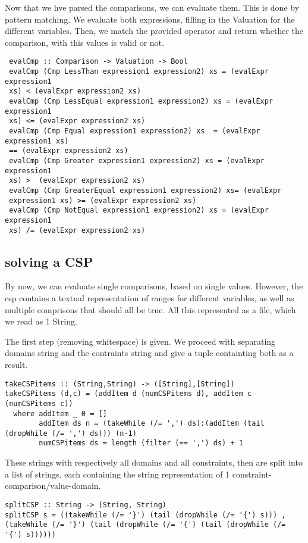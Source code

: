 \documentclass[a4paper,11pt]{article}
\begin{document}
 Now that we hve parsed the comparisons, we can evaluate them. This is done 
 by pattern matching. We evaluate both expressions, filling in the Valuation 
 for the different variables. Then, we match the provided operator and 
 return whether the comparison, with this values is valid or not.
 \begin{lstlisting}
 evalCmp :: Comparison -> Valuation -> Bool
 evalCmp (Cmp LessThan expression1 expression2) xs = (evalExpr expression1 
 xs) < (evalExpr expression2 xs)
 evalCmp (Cmp LessEqual expression1 expression2) xs = (evalExpr expression1 
 xs) <= (evalExpr expression2 xs)
 evalCmp (Cmp Equal expression1 expression2) xs  = (evalExpr expression1 xs) 
 == (evalExpr expression2 xs)
 evalCmp (Cmp Greater expression1 expression2) xs = (evalExpr expression1 
 xs) >  (evalExpr expression2 xs)
 evalCmp (Cmp GreaterEqual expression1 expression2) xs= (evalExpr 
 expression1 xs) >= (evalExpr expression2 xs)
 evalCmp (Cmp NotEqual expression1 expression2) xs = (evalExpr expression1 
 xs) /= (evalExpr expression2 xs)
 \end{lstlisting}
 \subsection{solving a CSP}
 
 By now, we can evaluate single comparisons, based on single values. 
 However, the csp contains a textual representation of ranges for different 
 variables, as well as multiple comprisons that should all be true. All this 
 represented as a file, which we read as 1 String.
 
 The first step (removing whitespace) is given. We proceed with separating 
 domains string and the contraints string and give a tuple containting both 
 as a result.
 
\begin{lstlisting}
takeCSPitems :: (String,String) -> ([String],[String])
takeCSPitems (d,c) = (addItem d (numCSPitems d), addItem c (numCSPitems c))
  where addItem _ 0 = []
        addItem ds n = (takeWhile (/= ',') ds):(addItem (tail (dropWhile (/= ',') ds))) (n-1)
        numCSPitems ds = length (filter (== ',') ds) + 1
\end{lstlisting}
 
 These strings with respectively all domains and all constraints, then are split into a list of strings, each containing the string representation of 1 constraint-comparison/value-domain.
 
\begin{lstlisting}
splitCSP :: String -> (String, String)
splitCSP s = ((takeWhile (/= '}') (tail (dropWhile (/= '{') s))) , (takeWhile (/= '}') (tail (dropWhile (/= '{') (tail (dropWhile (/= '{') s))))))
\end{lstlisting}
 
\end{document}
